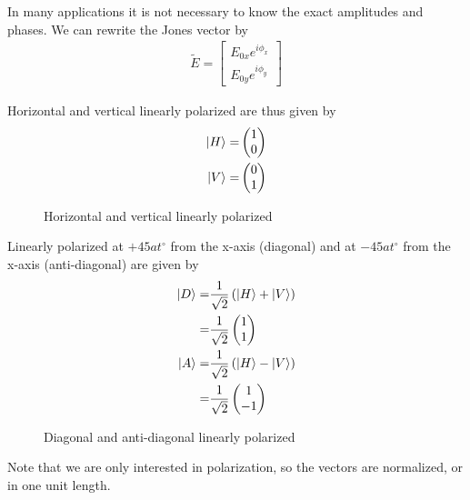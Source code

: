 In many applications it is not necessary to know the exact amplitudes and phases. We can rewrite the Jones vector by
\begin{align*}
    \tilde{E}=\begin{bmatrix}
        E_{0x}e^{i\phi_x}\\E_{0y}e^{i\phi_y}
    \end{bmatrix}
\end{align*}

Horizontal and vertical linearly polarized are thus given by
\begin{align*}
    \ket{H}=&\begin{pmatrix}
        1\\0
    \end{pmatrix}\\
    \ket{V}=&\begin{pmatrix}
        0\\1
    \end{pmatrix}
\end{align*}
\begin{figure}[H]
    \centering
    \caption{Horizontal and vertical linearly polarized}
\end{figure}

Linearly polarized at $+ 45 at^{\circ}$ from the x-axis (diagonal) and at $- 45 at^{\circ}$ from the x-axis (anti-diagonal) are given by
\begin{align*}
    \ket{D}=&\frac{1}{\sqrt{2}}\left(\ket{H}+\ket{V}\right)\\
    =&\frac{1}{\sqrt{2}}\begin{pmatrix}
        1\\1
    \end{pmatrix}\\
    \ket{A}=&\frac{1}{\sqrt{2}}\left(\ket{H}-\ket{V}\right)\\
    =&\frac{1}{\sqrt{2}}\begin{pmatrix}
        1\\-1
    \end{pmatrix}
\end{align*}
\begin{figure}[H]
    \centering
    \caption{Diagonal and anti-diagonal linearly polarized}
\end{figure}
Note that we are only interested in polarization, so the vectors are normalized, or in one unit length. 

